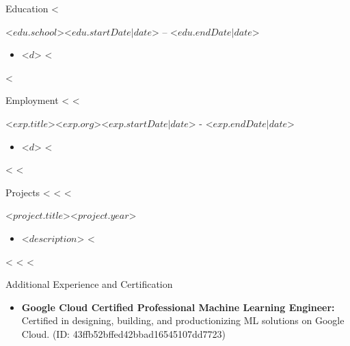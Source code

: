 \documentclass[]{mcdowellcv}
\begin{document}
	\makeheader
	

	\begin{cvsection}{Education}
		<%
		\begin{cvsubsection}{<$ edu.school $>}{}{<$ edu.startDate | date $> -- <$ edu.endDate | date $>}
			\begin{itemize}
					<%
				\item <$ d $>
					<%
			\end{itemize}
		\end{cvsubsection}
		<%
	\end{cvsection}

	\begin{cvsection}{Employment}
		<%
		<%
		\begin{cvsubsection}{<$ exp.title $>}{<$ exp.org $>}{<$ exp.startDate | date $> - <$ exp.endDate | date $>}
			\begin{itemize}
			<%
				\item <$ d $>
			<%
			\end{itemize}
		\end{cvsubsection}
		<%
		<%
	\end{cvsection}
		
    \begin{cvsection}{Projects}
	<%
	<%
	<%
        \begin{cvsubsection}{<$ project.title $>}{}{<$ project.year $>}
            \begin{itemize}
		<%
		\item  <$ description $>
		<%
            \end{itemize}
        \end{cvsubsection}
	<%
	<%
	<%
	\end{cvsection}

	\begin{cvsection}{Additional Experience and Certification}
		\begin{cvsubsection}{}{}{}	
			\begin{itemize}
				\item \textbf{Google Cloud Certified Professional Machine Learning Engineer:} Certified in designing, building, and productionizing ML solutions on Google Cloud. (ID: 43ffb52bffed42bbad16545107dd7723)
			\end{itemize}
		\end{cvsubsection}
	\end{cvsection}
	
\end{document}
